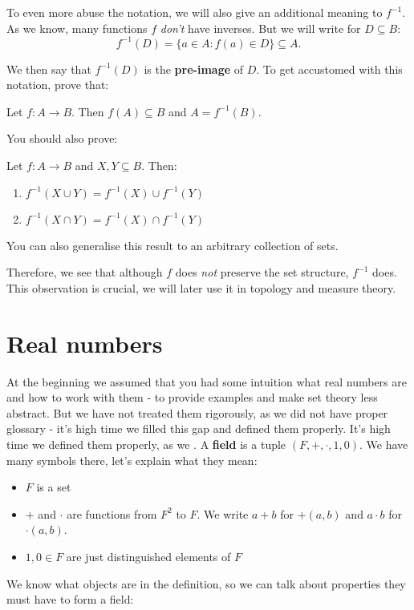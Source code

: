 \noindent To even more abuse the notation, we will also give an additional meaning to $f^{-1}$. As we know, many functions $f$ \textit{don't} have inverses. But we will write for $D\subseteq B$:
$$f^{-1}(D) = \{a \in A : f(a)\in D\}\subseteq A.$$

We then say that $f^{-1}(D)$ is the \textbf{pre-image} of $D$.
To get accustomed with this notation, prove that:

\begin{prob}
  Let $f:A\to B$. Then $f(A)\subseteq B$ and $A=f^{-1}(B)$.
\end{prob}

You should also prove:
\begin{prob}
  Let $f:A\to B$ and $X,Y\subseteq B$. Then:
  \begin{enumerate}
    \item $f^{-1}(X\cup Y)=f^{-1}(X)\cup f^{-1}(Y)$
    \item $f^{-1}(X\cap Y)=f^{-1}(X)\cap f^{-1}(Y)$
  \end{enumerate}
  You can also generalise this result to an arbitrary collection of
  sets.
\end{prob}
Therefore, we see that although $f$ does \textit{not} preserve the
set structure, $f^{-1}$ does. This observation is crucial, we will later use it in topology and measure theory.

\section{Real numbers}
At the beginning we assumed that you had some intuition what real numbers
are and how to work with them - to provide examples and make set theory less
abstract. But we have not treated them rigorously, as we did not have proper
glossary - it's high time we filled this gap and defined them properly.
It's high time we defined them properly, as we .
A \textbf{field} is a tuple $(F, +, \cdot, 1, 0).$ We have
many symbols there, let's explain what they mean:
\begin{itemize}
  \item $F$ is a set
  \item $+$ and $\cdot$ are functions from $F^2$ to $F$. We write
    $a+b$ for $+(a,b)$ and $a\cdot b$ for $\cdot (a,b)$.
  \item $1, 0\in F$ are just distinguished elements of $F$
\end{itemize}
We know what objects are in the definition, so we can talk about
properties they must have to form a field:

